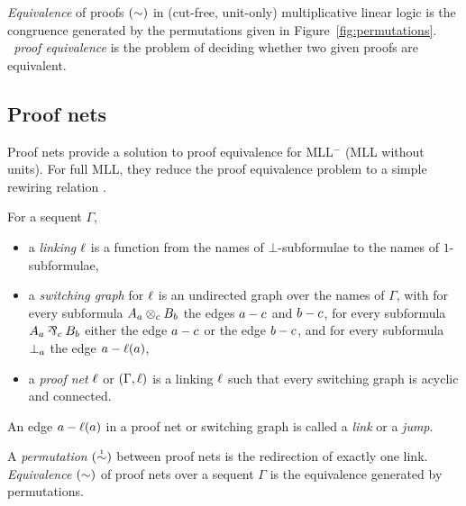 \documentclass[conference]{IEEEtran}
\begin{document}
\begin{definition}
\label{def:equivalence}
%
\emph{Equivalence} of proofs $(\perm)$ in (cut-free, unit-only) multiplicative linear logic is the congruence generated by the permutations given in Figure~\ref{fig:permutations}.
%
\emph{\MLL\ proof equivalence} is the problem of deciding whether two given proofs are equivalent.
%
\end{definition}



\subsection*{Proof nets}

Proof nets provide a solution to proof equivalence for MLL$^-$ (MLL without units).
%
For full MLL, they reduce the proof equivalence problem to a simple rewiring relation \cite{HughesMLLProofNets}.


\begin{definition}
\label{def:proof nets}
%
For a sequent $\Gamma$,
\begin{itemize}

	\item
	a \emph{linking} $\links$ is a function from the names of $\bot$-subformulae to the names of $1$-subformulae,

	\item
	a \emph{switching graph} for $\links$ is an undirected graph over the names of $\Gamma$, with for every subformula $\named aA\named c\tn\named bB$ the edges $\edge ac$ and $\edge bc$, for every subformula $\named aA\named c\parr\named bB$ either the edge $\edge ac$ or the edge $\edge bc$, and for every subformula $\named a\bot$ the edge $\edge a{\links(a)}$,

 	\item
	a \emph{proof net} $\links$ or $(\Gamma,\links)$ is a linking $\links$ such that every switching graph is acyclic and connected.

\end{itemize}
\end{definition}


\noindent
An edge $\edge a{\links(a)}$ in a proof net or switching graph is called a \emph{link} or a \emph{jump}.



\begin{definition}
\label{def:proof net equivalence}
%
A \emph{permutation} $(\perm*)$ between proof nets is the redirection of exactly one link.
%
\emph{Equivalence} $(\perm)$ of proof nets over a sequent $\Gamma$ is the equivalence generated by permutations.
%
\end{definition}
\end{document}

